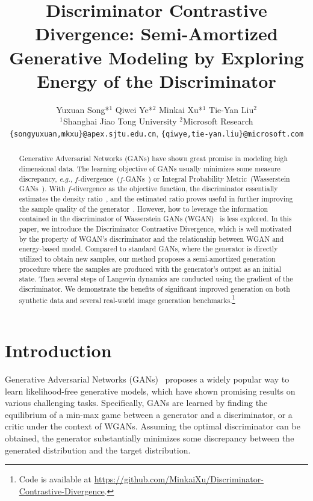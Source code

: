 \documentclass{article}
\title{Discriminator Contrastive Divergence: Semi-Amortized Generative Modeling by Exploring Energy of the Discriminator}
\author{Yuxuan Song*$^{1}$  Qiwei Ye*$^{2}$ Minkai Xu*$^{1}$ 
  Tie-Yan Liu$^{2}$\\
  $^{1}$Shanghai Jiao Tong University $^{2}$Microsoft Research\\
  \texttt{\{songyuxuan,mkxu\}@apex.sjtu.edu.cn}, \texttt{\{qiwye,tie-yan.liu\}@microsoft.com}
}
\begin{document}
\maketitle

\renewcommand{\thefootnote}{\fnsymbol{footnote}}
\renewcommand{\thefootnote}{\arabic{footnote}}

\begin{abstract}    
    Generative Adversarial Networks (GANs) have shown great promise in modeling high dimensional data. The learning objective of GANs usually minimizes some measure discrepancy, \textit{e.g.}, $f$-divergence~($f$-GANs~\cite{nowozin2016f}) or Integral Probability Metric~(Wasserstein GANs~\cite{arjovsky2017wasserstein}). With $f$-divergence as the objective function, the discriminator essentially estimates the density ratio~\cite{uehara2016generative}, and the estimated ratio proves useful in further improving the sample quality of the generator~\cite{azadi2018discriminator,turner2018metropolis}. However, how to leverage the information contained in the discriminator of Wasserstein GANs (WGAN)~\cite{arjovsky2017wasserstein} is less explored.  In this paper, we introduce the Discriminator Contrastive Divergence, which is well motivated by the property of WGAN's discriminator and the relationship between WGAN and energy-based model. Compared to standard GANs, where the generator is directly utilized to obtain new samples, our method proposes a semi-amortized generation procedure where the samples are produced with the generator's output as an initial state. Then several steps of Langevin dynamics are conducted using the gradient of the discriminator. We demonstrate the benefits of significant improved generation on both synthetic data and several real-world image generation benchmarks.\footnote{Code is available at \url{https://github.com/MinkaiXu/Discriminator-Contrastive-Divergence}.}
\end{abstract}

\section{Introduction}

Generative Adversarial Networks (GANs)~\cite{goodfellow2014generative} proposes a widely popular way to learn likelihood-free generative models, which have shown promising results on various challenging tasks. Specifically, GANs are learned by finding the equilibrium of a min-max game between a generator and a discriminator, or a critic under the context of WGANs. Assuming the optimal discriminator can be obtained, the generator substantially minimizes some discrepancy between the generated distribution and the target distribution. 
\end{document}
